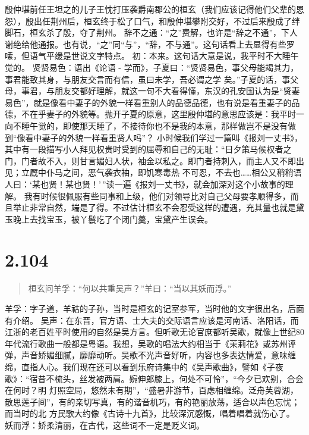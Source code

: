 \documentclass[]{book}
\begin{document}
殷仲堪前任王坦之的儿子王忱打压袭爵南郡公的桓玄（我们应该记得他们父辈的恩怨），殷出任荆州后，桓玄终于松了口气，和殷仲堪攀附交好，不过后来殷成了绊脚石，桓玄杀了殷，夺了荆州。
辞不之通：``之''费解，也许是``辞之不通''，下人谢绝给他通报。也有说，``之''同``与''，``辞，不与通''。这句话看上去显得有些罗嗦，但语气平缓是世说文字特点。
初：本来。这句话大意是说，我平时不大睡午觉的。 贤贤易色：语出《论语 -
学而》，子夏曰：``贤贤易色，事父母能竭其力，事君能致其身，与朋友交言而有信，虽曰未学，吾必谓之学
矣。''子夏的话，事父母，事君，与朋友交都好理解，就这一句不大看得懂，东汉的孔安国认为是``贤妻易色''，就是像看中妻子的外貌一样看重别人的品德品德，也有说是看重妻子的品德，不在乎妻子的外貌等。抛开子夏的原意，这里殷仲堪的意思应该是：我平时一向不睡午觉的，即使那天睡了，不接待你也不是我的本意，那样做岂不是没有做到``像看中妻子的外貌一样看重贤人吗''？
小时候我们学过一篇叫《报刘一丈书》，其中有一段描写小人拜见权贵时受到的屈辱和自己的无耻：``日夕策马候权者之门，门者故不入，则甘言媚妇人状，袖金以私之。即门者持刺入，而主人又不即出见；立厩中仆马之间，恶气袭衣袖，即饥寒毒热
不可忍，不去也\ldots{}\ldots{}相公又稍稍语人曰：`某也贤！某也贤！'\,''读一遍《报刘一丈书》，就会加深对这个小故事的理解。
我有时候很佩服有些同事和上级，他们对领导比对自己父母要孝顺得多，而且举止非常自然，端是了得。不过估计桓玄不会忍受这样的遭遇，充其量也就是黛玉晚上去找宝玉，被丫鬟吃了个闭门羹，宝黛产生误会。

\section{2.104}\label{section-150}

\begin{quote}
桓玄问羊孚：``何以共重吴声？''羊曰：``当以其妖而浮。''
\end{quote}

羊孚：字子道，羊祜的子孙，当时是桓玄的记室参军，当时他的文字很出名，后面有介绍。
吴声：在东晋，官方语、士大夫的交际语言应该是河南话、洛阳话，而江浙的老百姓平时使用的自然是吴方言。但听歌无论官庶都听吴歌，就像上世纪80年代流行歌曲一般都是粤语。我想，吴歌的唱法大约相当于《茉莉花》或苏州评弹，声音娇媚细腻，靡靡动听。吴歌不光声音好听，内容也多表达情爱，意味缠绵，直指人心。我们现在还可以看到乐府诗集中的《吴声歌曲》，譬如《子夜歌》：``宿昔不梳头，丝发被两肩。婉伸郎膝上，何处不可怜''，``今夕已欢别，合会在何时？明
灯照空局，悠然未有期''，``盛暑非游节，百虑相缠绵。泛舟芙蓉湖，散思莲子间''，有的亲切写真，有的谐音机巧，有的艳丽放荡，适合以声色忘忧；而当时的北
方民歌大约像《古诗十九首》，比较深沉感慨，唱着唱着就伤心了。
妖而浮：娇柔清丽，在古代，这些词不一定是贬义词。
\end{document}
